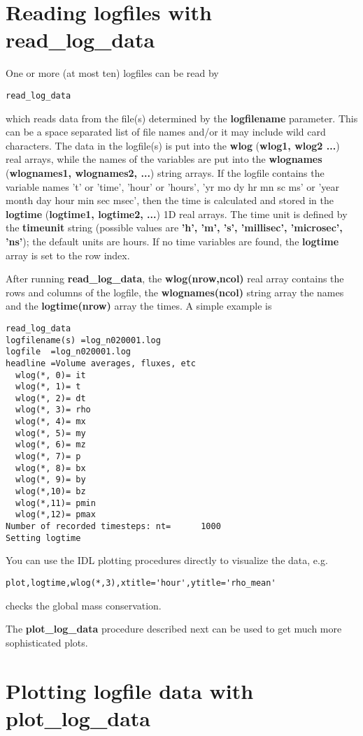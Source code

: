 \documentclass{article}
\begin{document}
\section{Reading logfiles with read\_log\_data \label{s-getlog}}

One or more (at most ten) logfiles can be read by
\begin{verbatim}
read_log_data
\end{verbatim}
which reads data from the file(s) determined by the {\bf logfilename} 
parameter. This can be a space separated list of file names and/or it
may include wild card characters. The data in the
logfile(s) is put into the {\bf wlog} ({\bf wlog1, wlog2 ...}) real arrays,
while the names of the variables are put into the {\bf wlognames} 
({\bf wlognames1, wlognames2, ...}) string arrays. If the logfile contains
the variable names 't' or 'time', 'hour' or 'hours',
'yr mo dy hr mn sc ms' or 'year month day hour min sec msec', 
then the time is calculated and stored in the {\bf logtime} 
({\bf logtime1, logtime2, ...}) 1D real arrays. 
The time unit is defined by the {\bf timeunit} string
(possible values are {\bf 'h', 'm', 's', 'millisec', 'microsec', 'ns'});
the default units are hours. 
If no time variables are found, the {\bf logtime} array is set to the
row index.

After running {\bf read\_log\_data}, the {\bf wlog(nrow,ncol)} real array 
contains the rows and columns of the logfile, 
the {\bf wlognames(ncol)} string array the names and the
{\bf logtime(nrow)} array the times. A simple example is 
\begin{verbatim}
read_log_data
logfilename(s) =log_n020001.log
logfile  =log_n020001.log
headline =Volume averages, fluxes, etc
  wlog(*, 0)= it
  wlog(*, 1)= t
  wlog(*, 2)= dt
  wlog(*, 3)= rho
  wlog(*, 4)= mx
  wlog(*, 5)= my
  wlog(*, 6)= mz
  wlog(*, 7)= p
  wlog(*, 8)= bx
  wlog(*, 9)= by
  wlog(*,10)= bz
  wlog(*,11)= pmin
  wlog(*,12)= pmax
Number of recorded timesteps: nt=      1000
Setting logtime
\end{verbatim}
You can use the IDL plotting procedures directly to visualize the data, e.g.
\begin{verbatim}
plot,logtime,wlog(*,3),xtitle='hour',ytitle='rho_mean'
\end{verbatim}
checks the global mass conservation. 

The {\bf plot\_log\_data} procedure described next can be used to get 
much more sophisticated plots. 

\section{Plotting logfile data with plot\_log\_data \label{s-plotlog}}
\end{document}
